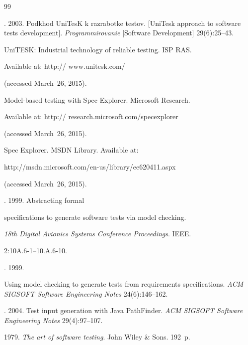 {{\begin{thebibliography}{99}


. 2003. Podkhod UniTesK k razrabotke testov. [UniTesk approach to software tests development]. \textit{Programmirovanie} [Software Development]  29(6):25--43.




UniTESK: Industrial technology of reliable testing. ISP RAS.


Available at: {\sf http:// www.unitesk.com/}


(accessed March~26, 2015).




Model-based testing with Spec Explorer. Microsoft Research.


Available at: {\sf http:// research.microsoft.com/specexplorer}


(accessed March~26, 2015).




Spec Explorer. MSDN Library. Available at:


{\sf http://msdn.microsoft.com/en-us/\linebreak library/ee620411.aspx}


(accessed March~26, 2015).




. 1999. Abstracting formal


specifications to generate software tests via model checking.


\textit{18th Digital Avionics Systems Conference Proceedings}. IEEE.


2:10A.6-1--10.A.6-10.




. 1999.


 Using model checking to generate tests from requirements specifications. \textit{ACM SIGSOFT Software Engineering Notes} 24(6):146--162.




. 2004. Test input generation with Java PathFinder. \textit{ACM SIGSOFT Software Engineering Notes} 29(4):97--107.




 1979. \textit{The art of software testing}. John Wiley \& Sons. 192~p.





\end{thebibliography}}}

